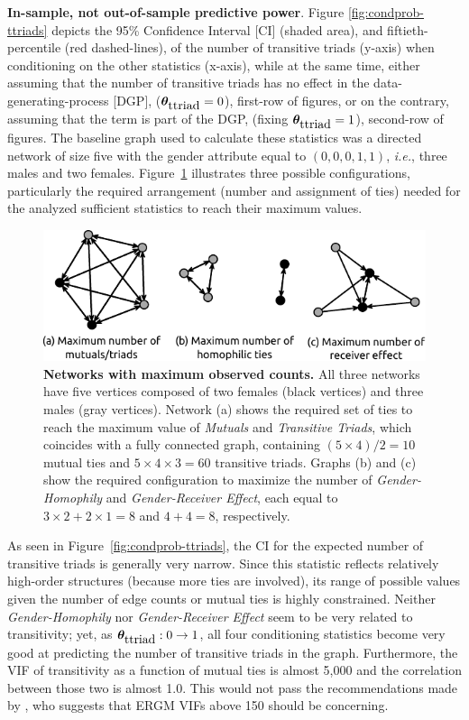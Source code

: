 \documentclass[12pt]{article}
\begin{document}
\noindent \textbf{In-sample, not out-of-sample predictive power}. Figure \ref{fig:condprob-ttriads} depicts the 95\% Confidence Interval [CI] (shaded area), and fiftieth-percentile (red dashed-lines), of the number of transitive triads (y-axis) when conditioning on the other statistics (x-axis), while at the same time, either assuming that the number of transitive triads has no effect in the data-generating-process [DGP], ($\bm{\theta}_{\mbox{ttriad}} = 0$), first-row of figures, or on the contrary, assuming that the term is part of the DGP, (fixing $\bm{\theta}_{\mbox{ttriad}}= 1$), second-row of figures. The baseline graph used to calculate these statistics was a directed network of size five with the gender attribute equal to $(0,0,0,1,1)$, \textit{i.e.}, three males and two females. Figure~\ref{fig:maxout-gof} illustrates three possible configurations, particularly the required arrangement (number and assignment of ties) needed for the analyzed sufficient statistics to reach their maximum values.

\begin{figure}[]
    \centering
    \includegraphics[width = .7\linewidth]{figures/max-out-stats.pdf}
    \caption[Examples of Networks with the maximum observed counts]{\textbf{Networks with maximum observed counts.} All three networks have five vertices composed of two females (black vertices) and three males (gray vertices).
    Network (a) shows the required set of ties to reach the maximum value of \textit{Mutuals} and \textit{Transitive Triads}, which coincides with a fully connected graph, containing $(5\times 4)/2 = 10$ mutual ties and $5 \times 4 \times 3 = 60$ transitive triads.
    Graphs (b) and (c) show the required configuration to maximize the number of \textit{Gender-Homophily} and \textit{Gender-Receiver Effect}, each equal to $3\times 2 + 2\times 1 = 8$ and $4 + 4 = 8$, respectively.}
    \label{fig:maxout-gof}
\end{figure}

As seen in Figure~\ref{fig:condprob-ttriads}, the CI for the expected number of transitive triads is generally very narrow. Since this statistic reflects relatively high-order structures (because more ties are involved), its range of possible values given the number of edge counts or mutual ties is highly constrained. Neither \textit{Gender-Homophily} nor \textit{Gender-Receiver Effect} seem to be very related to transitivity; yet, as $\bm{\theta}_{\mbox{ttriad}}: 0\to 1$, all four conditioning statistics become very good at predicting the number of transitive triads in the graph. Furthermore, the VIF of transitivity as a function of mutual ties is almost 5,000 and the correlation between those two is almost 1.0. This would not pass the recommendations made by \citeauthor*{duxburyDiagnosingMulticollinearityExponential2021}, who suggests that ERGM VIFs above 150 should be concerning.
\end{document}
